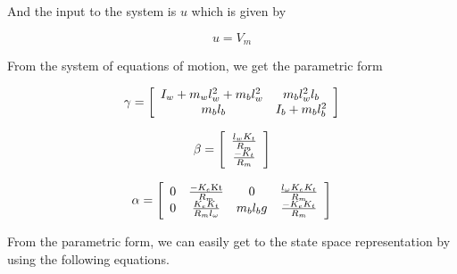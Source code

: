 \documentclass[11pt]{article}
\begin{document}
\begin{par}
\begin{flushleft}
And the input to the system is $u$ which is given by 
\end{flushleft}
\end{par}

\begin{par}
$$u=V_m$$
\end{par}

\begin{par}
\begin{flushleft}
From the system of equations of motion, we get the parametric form 
\end{flushleft}
\end{par}

\begin{par}
$$\gamma =\left\lbrack \begin{array}{cc}\linebreak 
I_w +m_w l_w^2 +m_b l_w^2  & m_b l_w^2 l_b \\\linebreak 
\;m_b l_b  & I_b +m_b l_b^2 \linebreak 
\end{array}\right\rbrack$$
\end{par}

\begin{par}
$$\beta =\left\lbrack \begin{array}{c}\linebreak 
\frac{l_w K_t }{R_m }\\\linebreak 
\frac{-K_t }{R_m }\linebreak 
\end{array}\right\rbrack$$
\end{par}

\begin{par}
$$\alpha =\left\lbrack \begin{array}{cccc}\linebreak 
0 & \frac{-K_e \mathrm{Kt}}{R_m } & 0 & \frac{l_{\omega } K_e K_t }{R_m }\\\linebreak 
0 & \frac{K_e K_t }{R_m l_{\omega } } & m_b l_b g & \frac{-K_e K_t }{R_m }\linebreak 
\end{array}\right\rbrack$$
\end{par}

\begin{par}
\begin{flushleft}
From the parametric form, we can easily get to the state space representation by using the following equations. 
\end{flushleft}
\end{par}
\end{document}

